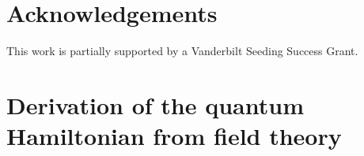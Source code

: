 \documentclass[a4paper, amsfonts, amssymb, amsmath, reprint, showkeys, nofootinbib, twoside, onecolumn,notitlepage]{revtex4-1}
\theoremstyle{definition}
\theoremstyle{theorem}
\begin{document}



\vspace{-0.2cm}
\section*{Acknowledgements}
\vspace{-0.2cm}

This work is partially supported by a Vanderbilt Seeding Success Grant.

 
\appendix

\vspace{-0.2cm}
\section{Derivation of the quantum Hamiltonian from field theory}\label{fieldTheory}
\vspace{-0.2cm}
\end{document}

